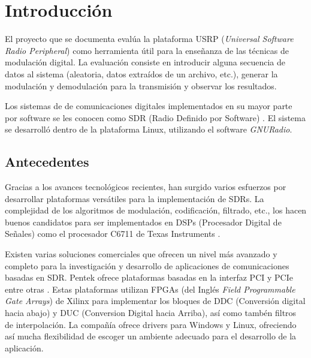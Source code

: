 \chapter{Introducci\'on}

El proyecto que se documenta eval\'ua la plataforma USRP (\emph{Universal Software Radio Peripheral}) como herramienta \'util
para la ense\~nanza de las t\'ecnicas de modulaci\'on digital. La evaluaci\'on consiste en introducir alguna secuencia de
datos al sistema (aleatoria, datos extra\'idos de un archivo, etc.), generar la modulaci\'on y demodulaci\'on para la
transmisi\'on y observar los resultados.

Los sistemas de de comunicaciones digitales implementados en su  mayor parte por software se les conocen como SDR (Radio
Definido por Software) \cite{mitola}. El sistema se desarroll\'o dentro de la plataforma Linux, utilizando el software
\emph{GNURadio}.

\section{Antecedentes}

Gracias a los avances tecnol\'ogicos recientes, han surgido varios esfuerzos por desarrollar plataformas vers\'atiles para
la implementaci\'on de SDRs. La complejidad de los algoritmos de modulaci\'on, codificaci\'on, filtrado, etc., los hacen buenos
candidatos para ser implementados en DSPs (Procesador Digital de Se\~nales) como el procesador C6711 de Texas Instruments
\cite{abendroth}.

Existen varias soluciones comerciales que ofrecen un nivel m\'as avanzado y completo para la investigaci\'on y desarrollo de
aplicaciones de comunicaciones basadas en SDR. Pentek ofrece plataformas basadas en la interfaz PCI y PCIe entre otras
\cite{pentek}. Estas plataformas utilizan FPGAs (del Ingl\'es \emph{Field Programmable Gate Arrays}) de Xilinx para implementar
los bloques de DDC (Conversi\'on digital hacia abajo) y DUC (Conversion Digital hacia Arriba), as\'i como tamb\'en filtros de
interpolaci\'on. La compa\~n\'ia ofrece drivers para Windows y Linux, ofreciendo as\'i mucha flexibilidad de escoger un
ambiente adecuado para el desarrollo de la aplicaci\'on.

